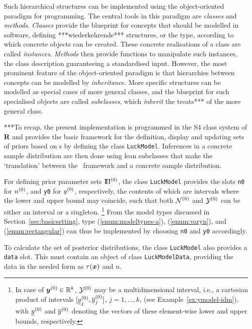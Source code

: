 Such hierarchical structures 
can be implemented using the object-oriented paradigm for programming.
The central tools in this paradigm are \emph{classes} and \emph{methods}.
\emph{Classes} provide the blueprint for concepts that should be modelled in software,
defining ***wiederkehrende*** structures, or the type, according to which concrete
objects can be created. These concrete realisations of a class are called \emph{instances}.
\emph{Methods} then provide functions to manipulate such instances,
the class description guaranteeing a standardised input.
However, the most prominent feature of the object-oriented paradigm is
that hierarchies between concepts can be modelled by \emph{inheritance}.
More specific structures can be modelled as special cases of more general classes,
and the blueprint for such specialised objects are called \emph{subclasses},
which \emph{inherit} the treats*** of the more general class.

***To recap, the present implementation is programmed in the S4 class system of
\textbf{R} and provides the basic framework for the definition, display and updating
sets of priors based on \model s by defining the class \texttt{LuckModel}.
Inferences in a concrete sample distribution are then done
using lean subclasses that make the `translation'
between the \model\ framework and a concrete sample distribution.

For defining prior parameter sets $\text{I}\!\Pi^{(0)}$,
the class \texttt{LuckModel} provides the slots \texttt{n0} for $n^{(0)}$, and \texttt{y0} for $y^{(0)}$, respectively,
the contents of which are intervals where the lower and upper bound may coincide,
such that both $\mathcal{N}^{(0)}$ and $\mathcal{Y}^{(0)}$ can be either an interval or a singleton.%
\footnote{In case of ${\bm y}^{(0)} \in \mathbb{R}^k$, $\mathcal{Y}^{(0)}$ may be a multidimensional interval,
i.e., a cartesian product of intervals $[\underline{y}^{(0)}_j,\overline{y}^{(0)}_j]$, $j=1,\ldots,k$,
(see Example~\ref{ex:ymodel-idm}),
with $\underline{y}^{(0)}$ and $\overline{y}^{(0)}$ denoting the vectors of these element-wise lower and upper bounds, respectively.} 
From the model types discussed in Section~\ref{sec:basicsetting}, type
(\ref{enum:modeltypes-a}), (\ref{enum:varyn}), and (\ref{enum:rectangular})
can thus be implemented by choosing \texttt{n0} and \texttt{y0} accordingly.

To calculate the set of posterior distributions,
the class \texttt{LuckModel} also provides a \texttt{data} slot.
This must contain an object of class \texttt{LuckModelData},
providing the data in the needed form as $\tau({\bm x})$ and $n$.

